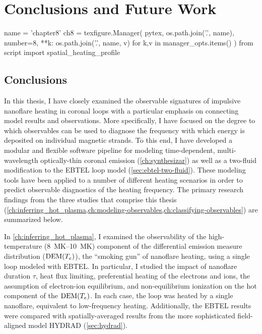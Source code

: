 \chapter{Conclusions and Future Work}\label{ch:conclusions}
\thispagestyle{firstpageofchapterstyle}

\begin{pycode}[chapter8]
name = 'chapter8'
ch8 = texfigure.Manager(
    pytex,
    os.path.join('.', name),
    number=8,
    **{k: os.path.join('.', name, v) for k,v in manager_opts.items()}
)
from script import spatial_heating_profile
\end{pycode}

\section{Conclusions}\label{sec:conclusions}

In this thesis, I have closely examined the observable signatures of impulsive nanoflare heating in \AR{} coronal loops with a particular emphasis on connecting model results and observations. More specifically, I have focused on the degree to which observables can be used to diagnose the frequency with which energy is deposited on individual magnetic strands. To this end, I have developed a modular and flexible software pipeline for modeling time-dependent, multi-wavelength optically-thin coronal emission (\autoref{ch:synthesizar}) as well as a two-fluid modification to the EBTEL loop model (\autoref{sec:ebtel-two-fluid}). These modeling tools have been applied to a number of different heating scenarios in order to predict observable diagnostics of the heating frequency. The primary research findings from the three studies that comprise this thesis (\cref{ch:inferring_hot_plasma,ch:modeling-observables,ch:classifying-observables}) are summarized below.

In \autoref{ch:inferring_hot_plasma}, I examined the observability of the high-temperature (\SIrange{8}{10}{\mega\kelvin}) component of the differential emission measure distribution ($\textup{DEM}(T_e)$), the ``smoking gun'' of nanoflare heating, using a single loop modeled with EBTEL. In particular, I studied the impact of nanoflare duration $\tau$, heat flux limiting, preferential heating of the electrons and ions, the assumption of electron-ion equilibrium, and non-equilibrium ionization on the hot component of the $\textup{DEM}(T_e)$. In each case, the loop was heated by a single nanoflare, equivalent to low-frequency heating. Additionally, the EBTEL results were compared with spatially-averaged results from the more sophisticated field-aligned model HYDRAD (\autoref{sec:hydrad}).

